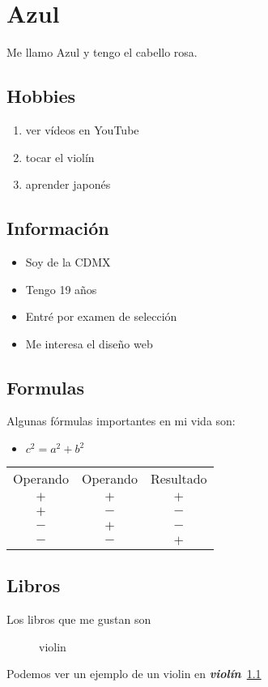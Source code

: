 \chapter{Azul}
Me llamo Azul y tengo el cabello rosa.

\section{Hobbies}

\begin{enumerate}
\item ver vídeos en YouTube
\item tocar el violín
\item aprender japonés
\end {enumerate}

\section{Información}

\begin{itemize}
\item Soy de la CDMX
\item Tengo 19 años
\item Entré por examen de selección
\item Me interesa el diseño web
\end{itemize}

\section{Formulas}
Algunas fórmulas importantes en mi vida son:
\begin{itemize}
\item $c^2=a^2+b^2$
\end{itemize}
  
\begin{table}[h]
  \centering
  \begin{tabular}{|c c c|}
    \hline
    Operando & Operando & Resultado\\
    $+$ & $+$ & $+$\\\hline
    $+$ & $-$ & $-$\\\hline
    $-$ & $+$ & $-$\\\hline
    $-$ & $-$ & $+$\\\hline
\end{tabular}
\end{table}

\section{Libros}
Los libros que me gustan son~\cite{salinger2001guardian, rice2014entrevista, shelley2008frankenstein, marias2011corazon}

\begin{figure}[h]
  \Centering
  \caption {violin}
  \label{fig:violin}
\end{figure}

Podemos ver un ejemplo de un violin en
\emph{\textbf {violín}}~\ref{fig:violin}